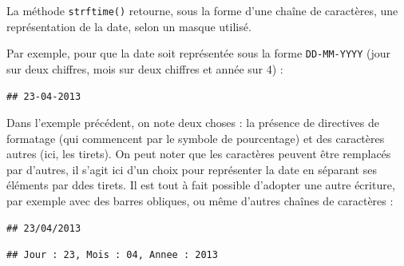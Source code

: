 \documentclass[12pt,]{book}
\newenvironment{Shaded}{\begin{snugshade}}{\end{snugshade}}
\newcommand{\SpecialCharTok}[1]{\textcolor[rgb]{0.00,0.00,0.00}{#1}}
\newcommand{\StringTok}[1]{\textcolor[rgb]{0.31,0.60,0.02}{#1}}
\newcommand{\OperatorTok}[1]{\textcolor[rgb]{0.81,0.36,0.00}{\textbf{#1}}}
\newcommand{\BuiltInTok}[1]{#1}
\newcommand{\NormalTok}[1]{#1}
\numberwithin{equation}{section}
\numberwithin{countremarque}{section}
\begin{document}
La méthode \texttt{strftime()} retourne, sous la forme d'une chaîne de
caractères, une représentation de la date, selon un masque utilisé.

Par exemple, pour que la date soit représentée sous la forme
\texttt{DD-MM-YYYY} (jour sur deux chiffres, mois sur deux chiffres et
année sur 4) :

\begin{Shaded}
\end{Shaded}

\begin{lstlisting}
## 23-04-2013
\end{lstlisting}

Dans l'exemple précédent, on note deux choses : la présence de
directives de formatage (qui commencent par le symbole de pourcentage)
et des caractères autres (ici, les tirets). On peut noter que les
caractères peuvent être remplacés par d'autres, il s'agit ici d'un choix
pour représenter la date en séparant ses éléments par ddes tirets. Il
est tout à fait possible d'adopter une autre écriture, par exemple avec
des barres obliques, ou même d'autres chaînes de caractères :

\begin{Shaded}
\end{Shaded}

\begin{lstlisting}
## 23/04/2013
\end{lstlisting}

\begin{Shaded}
\end{Shaded}

\begin{lstlisting}
## Jour : 23, Mois : 04, Annee : 2013
\end{lstlisting}
\end{document}

